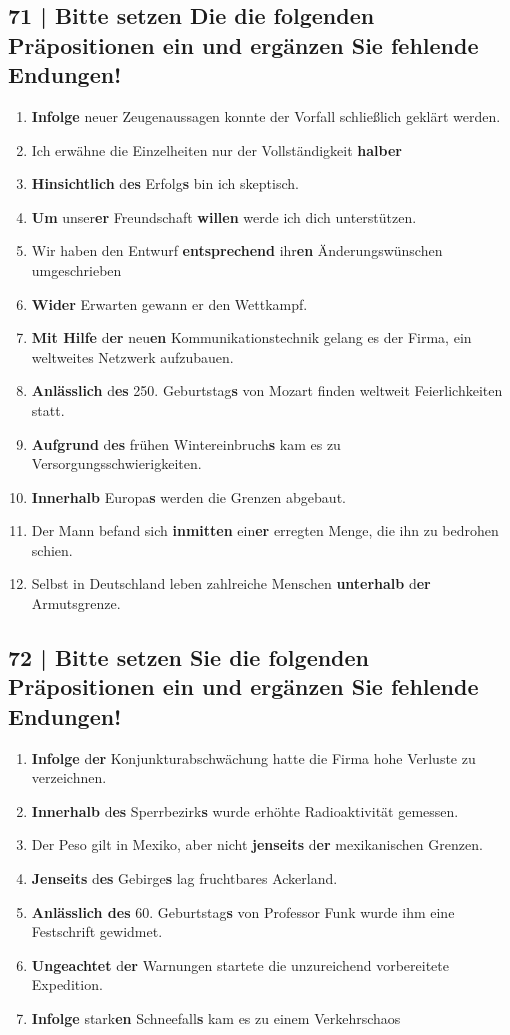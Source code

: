 \documentclass{article}
\begin{document}
	\subsection*{\textbf{71} | Bitte setzen Die die folgenden Präpositionen ein und ergänzen Sie fehlende Endungen!}
	\begin{enumerate}
		\item{\textbf{Infolge} neuer Zeugenaussagen konnte der Vorfall schließlich geklärt werden.}
		\item{Ich erwähne die Einzelheiten nur der Vollständigkeit \textbf{halber}}
		\item{\textbf{Hinsichtlich} d\textbf{es} Erfolg\textbf{s} bin ich skeptisch.}
		\item{\textbf{Um} unser\textbf{er} Freundschaft \textbf{willen} werde ich dich unterstützen.}
		\item{Wir haben den Entwurf \textbf{entsprechend} ihr\textbf{en} Änderungswünschen umgeschrieben}
		\item{\textbf{Wider} Erwarten gewann er den Wettkampf.}
		\item{\textbf{Mit Hilfe} d\textbf{er} neu\textbf{en} Kommunikationstechnik gelang es der Firma, ein weltweites Netzwerk aufzubauen.}
		\item{\textbf{Anlässlich} d\textbf{es} 250. Geburtstag\textbf{s} von Mozart finden weltweit Feierlichkeiten statt.}
		\item{\textbf{Aufgrund} d\textbf{es} frühen Wintereinbruch\textbf{s} kam es zu Versorgungsschwierigkeiten.}
		\item{\textbf{Innerhalb} Europa\textbf{s} werden die Grenzen abgebaut.}
		\item{Der Mann befand sich \textbf{inmitten} ein\textbf{er} erregten Menge, die ihn zu bedrohen schien.}
		\item{Selbst in Deutschland leben zahlreiche Menschen \textbf{unterhalb} d\textbf{er} Armutsgrenze.}
	\end{enumerate}
	\subsection*{\textbf{72} | Bitte setzen Sie die folgenden Präpositionen ein und ergänzen Sie fehlende Endungen!}
	\begin{enumerate}
		\item{\textbf{Infolge} d\textbf{er} Konjunkturabschwächung hatte die Firma hohe Verluste zu verzeichnen.}
		\item{\textbf{Innerhalb} d\textbf{es} Sperrbezirk\textbf{s} wurde erhöhte Radioaktivität gemessen.}
		\item{Der Peso gilt in Mexiko, aber nicht \textbf{jenseits} d\textbf{er} mexikanischen Grenzen.}
		\item{\textbf{Jenseits} d\textbf{es} Gebirge\textbf{s} lag fruchtbares Ackerland.}
		\item{\textbf{Anlässlich des} 60. Geburtstag\textbf{s} von Professor Funk wurde ihm eine Festschrift gewidmet.}
		\item{\textbf{Ungeachtet} d\textbf{er} Warnungen startete die unzureichend vorbereitete Expedition.}
		\item{\textbf{Infolge} stark\textbf{en} Schneefall\textbf{s} kam es zu einem Verkehrschaos}
	\end{enumerate}
\end{document}
